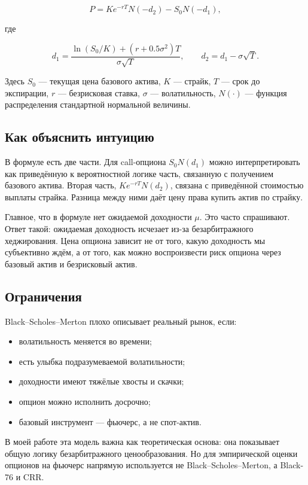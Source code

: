\documentclass[11pt,a4paper]{article}
\begin{document}
\[
P=Ke^{-rT}N(-d_2)-S_0N(-d_1),
\]

где

\[
d_1=\frac{\ln(S_0/K)+(r+0.5\sigma^2)T}{\sigma\sqrt{T}},
\qquad
d_2=d_1-\sigma\sqrt{T}.
\]

Здесь $S_0$ --- текущая цена базового актива, $K$ --- страйк, $T$ --- срок до экспирации, $r$ --- безрисковая ставка, $\sigma$ --- волатильность, $N(\cdot)$ --- функция распределения стандартной нормальной величины.

\subsection{Как объяснить интуицию}

В формуле есть две части. Для call-опциона $S_0N(d_1)$ можно интерпретировать как приведённую к вероятностной логике часть, связанную с получением базового актива. Вторая часть, $Ke^{-rT}N(d_2)$, связана с приведённой стоимостью выплаты страйка. Разница между ними даёт цену права купить актив по страйку.

Главное, что в формуле нет ожидаемой доходности $\mu$. Это часто спрашивают. Ответ такой: ожидаемая доходность исчезает из-за безарбитражного хеджирования. Цена опциона зависит не от того, какую доходность мы субъективно ждём, а от того, как можно воспроизвести риск опциона через базовый актив и безрисковый актив.

\subsection{Ограничения}

Black--Scholes--Merton плохо описывает реальный рынок, если:

\begin{itemize}
    \item волатильность меняется во времени;
    \item есть улыбка подразумеваемой волатильности;
    \item доходности имеют тяжёлые хвосты и скачки;
    \item опцион можно исполнить досрочно;
    \item базовый инструмент --- фьючерс, а не спот-актив.
\end{itemize}

В моей работе эта модель важна как теоретическая основа: она показывает общую логику безарбитражного ценообразования. Но для эмпирической оценки опционов на фьючерс напрямую используется не Black--Scholes--Merton, а Black-76 и CRR.
\end{document}
